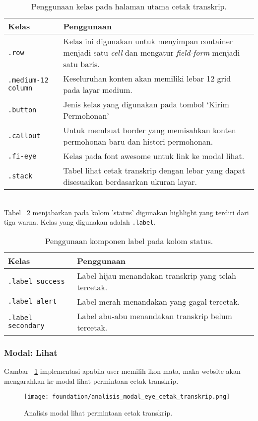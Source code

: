\begin{table}[H]
	\centering
	\caption{Penggunaan kelas pada halaman utama cetak transkrip.}
	\begin{tabularx}{\textwidth}{lX}
		\toprule
		Kelas     & Penggunaan \\
		\midrule
		\texttt{.row} & Kelas ini digunakan untuk menyimpan container menjadi satu \textit{cell} dan mengatur \textit{field-form} menjadi satu baris. \\
		\texttt{.medium-12 column}& Keseluruhan konten akan memiliki lebar 12 grid pada layar medium.\\
		\texttt{.button} & Jenis kelas yang digunakan pada tombol `Kirim Permohonan'\\
		\texttt{.callout} & Untuk membuat border yang memisahkan konten permohonan baru dan histori permohonan.\\
		\texttt{.fi-eye}& Kelas pada font awesome untuk link ke modal lihat.\\		
		\texttt{.stack} & Tabel lihat cetak transkrip dengan lebar yang dapat disesuaikan berdasarkan ukuran layar.\\
		\bottomrule
	\end{tabularx}%
	\label{table:analisisCetakTranskrip}
\end{table} \\ 

\noindent Tabel ~\ref{table:labelCetakTranskrip} menjabarkan pada kolom 'status' digunakan highlight yang terdiri dari tiga warna. Kelas yang digunakan adalah \texttt{.label}.\\

\begin{table}[H]
	\centering
	\caption{Penggunaan komponen label pada kolom status.}
	\begin{tabularx}{\textwidth}{lX}
		\toprule
		Kelas & Penggunaan \\
		\midrule
		\texttt{.label success} & Label hijau menandakan transkrip yang telah tercetak.\\
		\texttt{.label alert} & Label merah menandakan yang gagal tercetak.\\
		\texttt{.label secondary} & Label abu-abu menandakan transkrip belum tercetak.\\
		\bottomrule
	\end{tabularx}%
	\label{table:labelCetakTranskrip}
\end{table}%

\subsubsection{Modal: Lihat}
Gambar ~\ref{fig:analisisModalLihatPermintaanCetakTranskrip} implementasi apabila user memilih ikon mata, maka website akan mengarahkan ke modal lihat permintaan cetak transkrip.  \\
\begin{figure} [H]
	\centering  
	\texttt{[image: foundation/analisis\_modal\_eye\_cetak\_transkrip.png]}  
	\caption{Analisis modal lihat permintaan cetak transkrip.} 
	\label{fig:analisisModalLihatPermintaanCetakTranskrip}
\end{figure}

